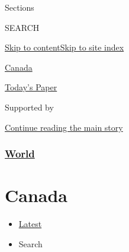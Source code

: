 Sections

SEARCH

\protect\hyperlink{site-content}{Skip to
content}\protect\hyperlink{site-index}{Skip to site index}

\href{https://www.nytimes.com/section/world/canada}{Canada}

\href{https://myaccount.nytimes.com/auth/login?response_type=cookie\&client_id=vi}{}

\href{https://www.nytimes.com/section/todayspaper}{Today's Paper}

Supported by

\protect\hyperlink{after-sponsor}{Continue reading the main story}

\hypertarget{world}{%
\subsubsection{\texorpdfstring{\href{/section/world}{World}}{World}}\label{world}}

\hypertarget{canada}{%
\section{Canada}\label{canada}}

\begin{itemize}
\tightlist
\item
  \protect\hyperlink{stream-panel}{Latest}
\item
  Search
\end{itemize}

